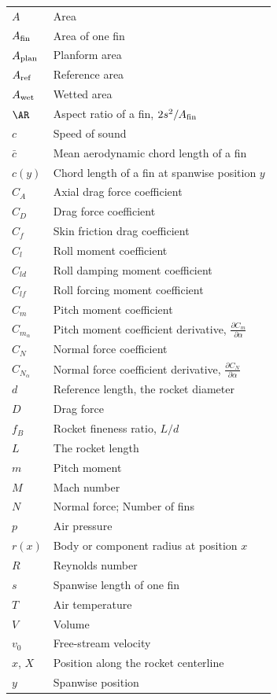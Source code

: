 \documentclass[a4paper,12pt,oneside]{book}
\newcommand{\CNa}{\ensuremath{{C_{N_\alpha}}}}
\newcommand{\Cma}{\ensuremath{C_{m_\alpha}}}
\newcommand{\Aref}{\ensuremath{A_{\rm ref}}}
\newcommand{\Afin}{\ensuremath{A_{\rm fin}}}
\begin{document}
\begin{tabular}{p{20mm}p{105mm}}

$A$           & Area \\
\Afin         & Area of one fin \\
$A_{\rm plan}$& Planform area \\
\Aref         & Reference area \\
$A_{\rm wet}$ & Wetted area \\
$\AR$         & Aspect ratio of a fin, $2s^2/\Afin$ \\
$c$           & Speed of sound \\
$\bar c$      & Mean aerodynamic chord length of a fin \\
$c(y)$        & Chord length of a fin at spanwise position $y$ \\

$C_A$         & Axial drag force coefficient \\
$C_D$         & Drag force coefficient \\
$C_f$         & Skin friction drag coefficient \\
$C_l$         & Roll moment coefficient \\
$C_{ld}$      & Roll damping moment coefficient \\
$C_{lf}$      & Roll forcing moment coefficient \\

$C_m$         & Pitch moment coefficient \\
\Cma          & Pitch moment coefficient derivative, 
                $\frac{\partial C_m}{\partial \alpha}$ \\

$C_N$         & Normal force coefficient \\
\CNa          & Normal force coefficient derivative,
                $\frac{\partial C_N}{\partial \alpha}$ \\

$d$           & Reference length, the rocket diameter \\
$D$           & Drag force \\
$f_B$         & Rocket fineness ratio, $L/d$ \\
$L$           & The rocket length \\
$m$           & Pitch moment \\
$M$           & Mach number \\
$N$           & Normal force; Number of fins \\
$p$           & Air pressure \\
$r(x)$        & Body or component radius at position $x$ \\
$R$           & Reynolds number \\
$s$           & Spanwise length of one fin \\
$T$           & Air temperature \\
$V$           & Volume \\
$v_0$         & Free-stream velocity \\
$x$, $X$      & Position along the rocket centerline \\
$y$           & Spanwise position \\
\end{tabular}
\end{document}
